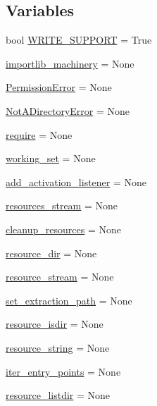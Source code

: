 \subsection*{Variables}
\begin{DoxyCompactItemize}
\item 
bool \hyperlink{namespacepkg__resources_ac38be55a5c8ca8c232e44dec0c2854c5}{W\+R\+I\+T\+E\+\_\+\+S\+U\+P\+P\+O\+RT} = True
\item 
\hyperlink{namespacepkg__resources_a66b38c27156e4bfec03efd41393cdbe1}{importlib\+\_\+machinery} = None
\item 
\hyperlink{namespacepkg__resources_a21e0a5d62c0124af6c79dbfc4d9a6dde}{Permission\+Error} = None
\item 
\hyperlink{namespacepkg__resources_adc0c67773fee65e0b67b4940fc658466}{Not\+A\+Directory\+Error} = None
\item 
\hyperlink{namespacepkg__resources_a4b0ffc0687f16fe370416cea417a456f}{require} = None
\item 
\hyperlink{namespacepkg__resources_a5eecf7277dc4e63e653bfa39a805e4d2}{working\+\_\+set} = None
\item 
\hyperlink{namespacepkg__resources_a4a44c235f589f75c875c7f50d393214c}{add\+\_\+activation\+\_\+listener} = None
\item 
\hyperlink{namespacepkg__resources_aa5150f8a5dc0c8a25647e076b7ea642c}{resources\+\_\+stream} = None
\item 
\hyperlink{namespacepkg__resources_a095e28834fa3aa947015d2741c5582c0}{cleanup\+\_\+resources} = None
\item 
\hyperlink{namespacepkg__resources_aecfd8f199411bf803635a831918594bb}{resource\+\_\+dir} = None
\item 
\hyperlink{namespacepkg__resources_a118f064bfa3877be4193e9625ce77860}{resource\+\_\+stream} = None
\item 
\hyperlink{namespacepkg__resources_a2f0d36a78ded6f3d29365c541464f923}{set\+\_\+extraction\+\_\+path} = None
\item 
\hyperlink{namespacepkg__resources_a0580c0fcb1ada90918f5e9affeb2dc8f}{resource\+\_\+isdir} = None
\item 
\hyperlink{namespacepkg__resources_a929d3bc500116a3cacb30f0fb11c2f46}{resource\+\_\+string} = None
\item 
\hyperlink{namespacepkg__resources_a0003897e2044a6bedb14a89ad7cc5ce9}{iter\+\_\+entry\+\_\+points} = None
\item 
\hyperlink{namespacepkg__resources_a2d9efe1bc722649989e4fd568f646418}{resource\+\_\+listdir} = None

\end{DoxyCompactItemize}
